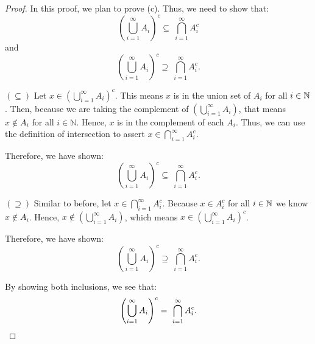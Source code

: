 \begin{customframedproof}[linecolor=horange!75]

    \begin{proof}
        In this proof, we plan to prove (c). Thus, we need to show that:
        \[
            \left( \bigcup_{i=1}^{\infty} A_i \right)^c \subseteq \ \bigcap_{i=1}^{\infty} A_i^c
        \]
        and
        \[
            \left( \bigcup_{i=1}^{\infty} A_i \right)^c \supseteq \ \bigcap_{i=1}^{\infty} A_i^c.
        \]
        \begin{proofpart}[horange]{\((\subseteq)\)}
            Let \(x \in \left( \bigcup_{i=1}^{\infty} A_i \right)^c\). This means \(x\) is in the union set of \(A_i\) for all \(i \in \mathbb{N}\). Then, because we are taking the complement of \(\left( \bigcup_{i=1}^{\infty} A_i \right)\), that means \(x \notin A_i\) for all \(i \in \mathbb{N}\). Hence, \(x\) is in the complement of each \(A_i\). Thus, we can use the definition of intersection to assert \(x \in \bigcap_{i=1}^{\infty} A_i^c\).

            Therefore, we have shown:
            \[
                \left( \bigcup_{i=1}^{\infty} A_i \right)^c \subseteq \ \bigcap_{i=1}^{\infty} A_i^c.
            \]
        \end{proofpart}
        \vspace{2mm}
        \begin{proofpart}[horange]{\((\supseteq)\)}
            Similar to before, let \(x \in \bigcap_{i=1}^{\infty} A_i^c\). Because \(x \in A^c_i\) for all \(i \in \mathbb{N}\) we know \(x \notin A_i\). Hence, \(x \notin \left(\bigcup_{i=1}^{\infty} A_i\right)\), which means \(x \in \left( \bigcup_{i=1}^{\infty} A_i \right)^c\).

            Therefore, we have shown:
            \[
                \left( \bigcup_{i=1}^{\infty} A_i \right)^c \supseteq \ \bigcap_{i=1}^{\infty} A_i^c.
            \]
        \end{proofpart}

        By showing both inclusions, we see that:
        \[
            \left( \bigcup_{i=1}^{\infty} A_i \right)^c = \ \bigcap_{i=1}^{\infty} A_i^c. \qedhere
        \]
    \end{proof}
\end{customframedproof}